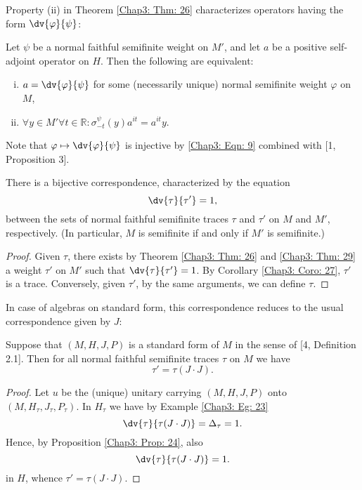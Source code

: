 Property (ii) in Theorem \ref{Chap3: Thm: 26} characterizes operators having the form $\dv{\varphi}{\psi}$:
\begin{theorem}\label{Chap3: Thm: 29}
    Let $\psi$ be a normal faithful semifinite weight on $M'$, and let $a$ be a positive self-adjoint operator on $H$. Then the following are equivalent:
    \begin{enumerate}[(i)]
        \item $a=\dv{\varphi}{\psi}$ for some (necessarily unique) normal semifinite weight $\varphi$ on $M$,
        \item $\forall y\in M'\forall t\in \mathbb{R}:\sigma_{-t}^{\psi}(y)a^{it}=a^{it}y$.
    \end{enumerate}
\end{theorem}
Note that $\varphi\mapsto\dv{\varphi}{\psi}$ is injective by \eqref{Chap3: Eqn: 9} combined with [1,
        Proposition 3].
\begin{corollary}
    There is a bijective correspondence, characterized by the equation
    \begin{equation}\label{Chap3: Eqn: 17}
        \dv{\tau}{\tau'}=1,
    \end{equation}
    between the sets of normal faithful semifinite traces $\tau$ and $\tau'$ on $M$ and $M'$, respectively. (In particular, $M$ is semifinite if and only if $M'$ is semifinite.)
\end{corollary}
\begin{proof}
    Given $\tau$, there exists by Theorem \ref{Chap3: Thm: 26} and \ref{Chap3: Thm: 29} a weight $\tau'$ on $M'$ such that $\dv{\tau}{\tau'}=1$. By Corollary \ref{Chap3: Coro: 27}, $\tau'$ is a trace. Conversely, given $\tau'$, by the same arguments, we can define $\tau$.
\end{proof}
In case of algebras on standard form, this correspondence reduces to the usual correspondence given by $J$:
\begin{corollary}
    Suppose that $(M,H,J,P)$ is a standard form of $M$ in the sense of [4, Definition 2.1]. Then for all normal faithful semifinite traces $\tau$ on $M$ we have
    \[
        \tau'=\tau(J\cdot J).
    \]
\end{corollary}
\begin{proof}
    Let $u$ be the (unique) unitary carrying $(M,H,J,P)$ onto $(M,H_\tau,J_\tau,P_\tau)$. In $H_\tau$ we have by Example \ref{Chap3: Eg: 23}
    \[
        \dv{\tau}{\tau(J\cdot J)}=\Delta_\tau=1.
    \]
    Hence, by Proposition \ref{Chap3: Prop: 24}, also
    \[
        \dv{\tau}{\tau(J\cdot J)}=1.
    \]
    in $H$, whence $\tau'=\tau(J\cdot J)$.
\end{proof}
